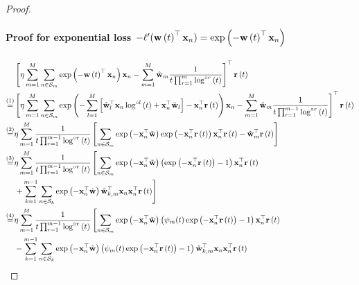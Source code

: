 \documentclass[twoside,11pt,english]{article}
\begin{document}
{\begin{proof}
\paragraph{Proof for exponential loss $-\ell'(\mathbf{w}\left(t\right)^{\top}\mathbf{x}_{n})=\exp\left(-\mathbf{w}\left(t\right)^{\top}\mathbf{x}_{n}\right)$}
\begin{align}
 & \left[\eta\sum_{m=1}^{M}\sum_{n\in\set_{m}}\exp\left(-\w\left(t\right)^{\top}\mathbf{x}_{n}\right)\mathbf{x}_{n}-\sum_{m=1}^{M}\hat{\mathbf{w}}_{m}\frac{1}{t\prod_{r=1}^{m}\log^{\circ r}\left(t\right)}\right]^{\top}\mathbf{r}\left(t\right)\nonumber \\
\overset{\left(1\right)}{=} & \left[\eta\sum_{m=1}^{M}\sum_{n\in\set_{m}}\exp\left(-\sum_{l=1}^{M}\left[\hat{\mathbf{w}}_{l}^{\top}\x_{n}\log^{\circ l}\left(t\right)+\mathbf{x}_{n}^{\top}\wtilde_{l}\right]-\mathbf{x}_{n}^{\top}\mathbf{r}\left(t\right)\right)\mathbf{x}_{n}-\sum_{m=1}^{M}\hat{\mathbf{w}}_{m}\frac{1}{t\prod_{r=1}^{m-1}\log^{\circ r}\left(t\right)}\right]^{\top}\mathbf{r}\left(t\right)\nonumber \\
\overset{\left(2\right)}{=} & \eta\sum_{m=1}^{M}\frac{1}{t\prod_{r=1}^{m-1}\log^{\circ r}\left(t\right)}\left[\sum_{n\in\set_{m}}\exp\left(-\mathbf{x}_{n}^{\top}\wtilde\right)\exp\left(-\mathbf{x}_{n}^{\top}\mathbf{r}\left(t\right)\right)\mathbf{x}_{n}^{\top}\mathbf{r}\left(t\right)-\hat{\mathbf{w}}_{m}^{\top}\mathbf{r}\left(t\right)\right]\nonumber \\
\overset{\left(3\right)}{=} & \eta\sum_{m=1}^{M}\frac{1}{t\prod_{r=1}^{m-1}\log^{\circ r}\left(t\right)}\left[\sum_{n\in\set_{m}}\exp\left(-\mathbf{x}_{n}^{\top}\wtilde\right)\left(\exp\left(-\mathbf{x}_{n}^{\top}\mathbf{r}\left(t\right)\right)-1\right)\mathbf{x}_{n}^{\top}\mathbf{r}\left(t\right)\right.\nonumber\\
&\left.+\sum_{k=1}^{m-1}\sum_{n\in \set_k}\exp\left(-\mathbf{x}_{n}^{\top}\wtilde\right)\check{\mathbf{w}}_{k,m}^{\top}\mathbf{x}_n\mathbf{x}_{n}^{\top}\mathbf{r}\left(t\right)\right]\nonumber \\
\overset{\left(4\right)}{=} & \eta\sum_{m=1}^{M}\frac{1}{t\prod_{r=1}^{m-1}\log^{\circ r}\left(t\right)}\left[\sum_{n\in\set_{m}}\exp\left(-\mathbf{x}_{n}^{\top}\wtilde\right)\left(\psi_m(t)\exp\left(-\mathbf{x}_{n}^{\top}\mathbf{r}\left(t\right)\right)-1\right)\mathbf{x}_{n}^{\top}\mathbf{r}\left(t\right)\right.\nonumber\\
&-\sum_{k=1}^{m-1}\sum_{n\in \set_k}\exp\left(-\mathbf{x}_{n}^{\top}\wtilde\right)\left(\psi_m(t)\exp\left(-\mathbf{x}_{n}^{\top}\mathbf{r}\left(t\right)\right)-1\right)\check{\mathbf{w}}_{k,m}^{\top}\mathbf{x}_n\mathbf{x}_{n}^{\top}\mathbf{r}\left(t\right)\nonumber \\

\end{align}
\end{proof}}
\end{document}
